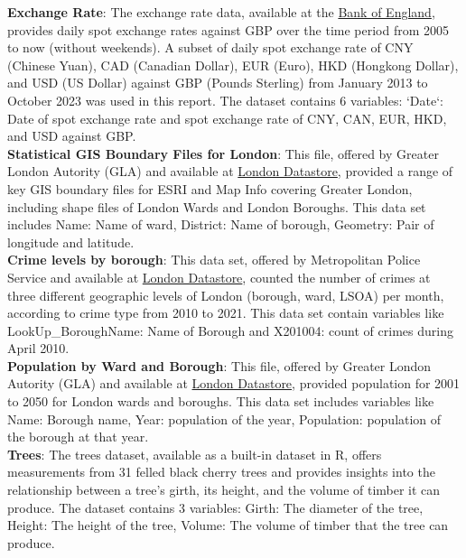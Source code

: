\documentclass{article}\usepackage[]{graphicx}\usepackage[]{xcolor}
\begin{document}
\noindent
\textbf{Exchange Rate}: The exchange rate data, available at the \href{https://www.bankofengland.co.uk/boeapps/database/index.asp?first=yes&SectionRequired=I&HideNums=-1&ExtraInfo=true&Travel=NIx}{Bank of England}, provides daily spot exchange rates against GBP over the time period from 2005 to now (without weekends). A subset of daily spot exchange rate of CNY (Chinese Yuan), CAD (Canadian Dollar), EUR (Euro), HKD (Hongkong Dollar), and USD (US Dollar) against GBP (Pounds Sterling) from January 2013 to October 2023 was used in this report. The dataset contains 6 variables: `Date`: Date of spot exchange rate and spot exchange rate of CNY, CAN, EUR, HKD, and USD against GBP.\\

\noindent
\textbf{Statistical GIS Boundary Files for London}: This file, offered by Greater London Autority (GLA) and available at \href{https://data.london.gov.uk/dataset/statistical-gis-boundary-files-london}{London Datastore}, provided a range of key GIS boundary files for ESRI and Map Info covering Greater London, including shape files of London Wards and London Boroughs. This data set includes Name: Name of ward, District: Name of borough, Geometry: Pair of longitude and latitude.\\

\noindent
\textbf{Crime levels by borough}: This data set, offered by Metropolitan Police Service and available at \href{https://data.london.gov.uk/dataset/recorded_crime_summary}{London Datastore}, counted the number of crimes at three different geographic levels of London (borough, ward, LSOA) per month, according to crime type from 2010 to 2021. This data set contain variables like LookUp\_BoroughName: Name of Borough and X201004: count of crimes during April 2010.\\

\noindent
\textbf{Population by Ward and Borough}: This file, offered by Greater London Autority (GLA) and available at \href{https://data.london.gov.uk/dataset/land-area-and-population-density-ward-and-borough}{London Datastore}, provided population for 2001 to 2050 for London wards and boroughs. This data set includes variables like Name: Borough name, Year: population of the year, Population: population of the borough at that year.\\

\noindent
\textbf{Trees}: The trees dataset, available as a built-in dataset in R, offers measurements from 31 felled black cherry trees and provides insights into the relationship between a tree's girth, its height, and the volume of timber it can produce. The dataset contains 3 variables: Girth: The diameter of the tree, Height: The height of the tree, Volume: The volume of timber that the tree can produce.\\
\end{document}
